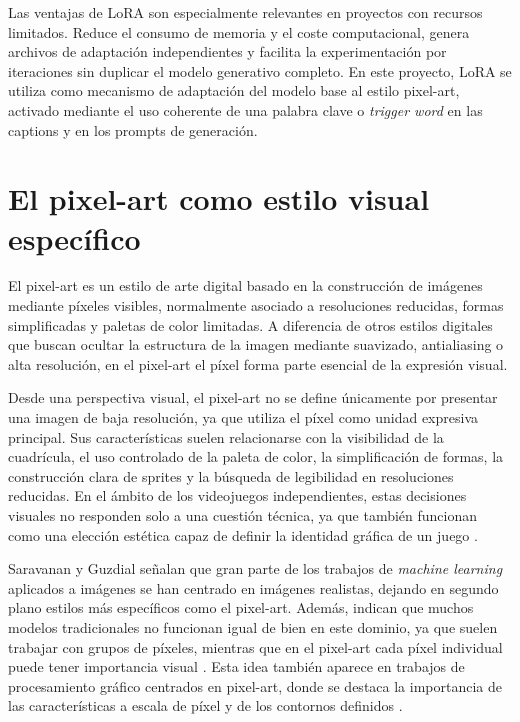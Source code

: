 \documentclass[a4paper,11pt,titlepage]{scrbook}
\begin{document}
\medskip

Las ventajas de LoRA son especialmente relevantes en proyectos con recursos limitados. Reduce el consumo de memoria y el coste computacional, genera archivos de adaptación independientes y facilita la experimentación por iteraciones sin duplicar el modelo generativo completo. En este proyecto, LoRA se utiliza como mecanismo de adaptación del modelo base al estilo pixel-art, activado mediante el uso coherente de una palabra clave o \textit{trigger word} en las captions y en los prompts de generación.

\section{El pixel-art como estilo visual específico}

El pixel-art es un estilo de arte digital basado en la construcción de imágenes mediante píxeles visibles, normalmente asociado a resoluciones reducidas, formas simplificadas y paletas de color limitadas. A diferencia de otros estilos digitales que buscan ocultar la estructura de la imagen mediante suavizado, antialiasing o alta resolución, en el pixel-art el píxel forma parte esencial de la expresión visual.

\medskip

Desde una perspectiva visual, el pixel-art no se define únicamente por presentar una imagen de baja resolución, ya que utiliza el píxel como unidad expresiva principal. Sus características suelen relacionarse con la visibilidad de la cuadrícula, el uso controlado de la paleta de color, la simplificación de formas, la construcción clara de sprites y la búsqueda de legibilidad en resoluciones reducidas. En el ámbito de los videojuegos independientes, estas decisiones visuales no responden solo a una cuestión técnica, ya que también funcionan como una elección estética capaz de definir la identidad gráfica de un juego \cite{kylmaaho2019pixelgraphics}.


\medskip

Saravanan y Guzdial señalan que gran parte de los trabajos de \textit{machine learning} aplicados a imágenes se han centrado en imágenes realistas, dejando en segundo plano estilos más específicos como el pixel-art. Además, indican que muchos modelos tradicionales no funcionan igual de bien en este dominio, ya que suelen trabajar con grupos de píxeles, mientras que en el pixel-art cada píxel individual puede tener importancia visual \cite{saravanan2022pixelvqvae}. Esta idea también aparece en trabajos de procesamiento gráfico centrados en pixel-art, donde se destaca la importancia de las características a escala de píxel y de los contornos definidos \cite{kopf2011depixelizing}.
\end{document}
